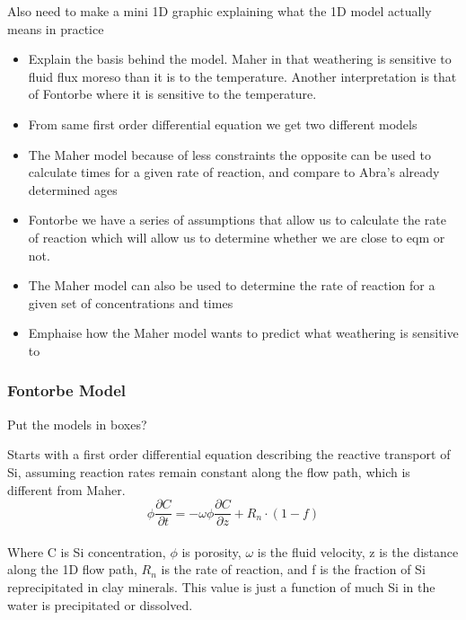 \bsk

Also need to make a mini 1D graphic explaining what the 1D model actually means in practice




\begin{itemize}
    \item Explain the basis behind the model. Maher in that weathering is sensitive to fluid flux moreso than it is to the temperature. Another interpretation is that of Fontorbe where it is sensitive to the temperature.
    \item From same first order differential equation we get two different models
    \item The Maher model because of less constraints the opposite can be used to calculate times for a given rate of reaction, and compare to Abra's already determined ages
    \item Fontorbe we have a series of assumptions that allow us to calculate the rate of reaction which will allow us to determine whether we are close to eqm or not.
    \item The Maher model can also be used to determine the rate of reaction for a given set of concentrations and times
    \item Emphaise how the Maher model wants to predict what weathering is sensitive to

\end{itemize}


\newpage



\subsubsection{Fontorbe Model}

Put the models in boxes?

\bsk

Starts with a first order differential equation describing the reactive transport of Si, assuming reaction rates remain constant along the flow path, which is different from Maher.\\

\begin{equation}
\phi \frac{\partial C}{\partial t} = -\omega \phi \frac{\partial C}{\partial z} + R_n\cdot\left(1-f\right)
\end{equation}\\


Where C is Si concentration, $\phi$ is porosity, $\omega$ is the fluid velocity, z is the distance along the 1D flow path, $R_n$ is the rate of reaction, and f is the fraction of Si reprecipitated in clay minerals. This value is just a function of much Si in the water is precipitated or dissolved. \\

